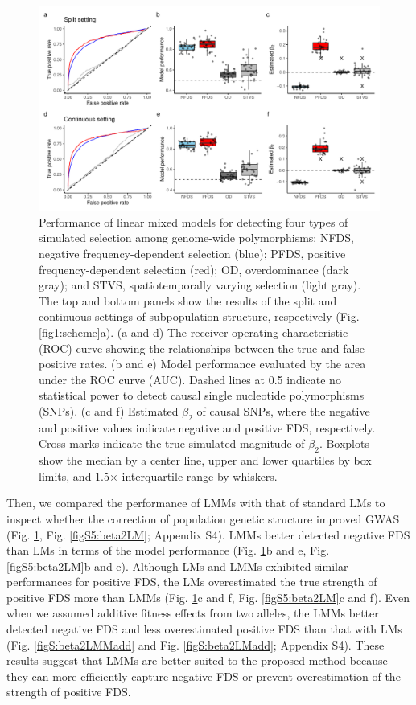 \documentclass[12pt,]{article}
\begin{document}
\begin{figure}[ht]
  \includegraphics[width=0.85\linewidth]{beta2LMMdomi.pdf}
  \caption{Performance of linear mixed models for detecting four types of simulated selection among genome-wide polymorphisms: NFDS, negative frequency-dependent selection (blue); PFDS, positive frequency-dependent selection (red); OD, overdominance (dark gray); and STVS, spatiotemporally varying selection (light gray). The top and bottom panels show the results of the split and continuous settings of subpopulation structure, respectively (Fig. \ref{fig1:scheme}a). (a and d) The receiver operating characteristic (ROC) curve showing the relationships between the true and false positive rates. (b and e) Model performance evaluated by the area under the ROC curve (AUC). Dashed lines at 0.5 indicate no statistical power to detect causal single nucleotide polymorphisms (SNPs). (c and f) Estimated $\beta_2$ of causal SNPs, where the negative and positive values indicate negative and positive FDS, respectively. Cross marks indicate the true simulated magnitude of $\beta_2$. Boxplots show the median by a center line, upper and lower quartiles by box limits, and 1.5$\times$ interquartile range by whiskers.}
  \label{fig4:beta2LMM}
\end{figure}

Then, we compared the performance of LMMs with that of standard LMs to inspect whether the correction of population genetic structure improved GWAS (Fig. \ref{fig4:beta2LMM}, Fig. \ref{figS5:beta2LM}; Appendix S4). LMMs better detected negative FDS than LMs in terms of the model performance (Fig. \ref{fig4:beta2LMM}b and e, Fig. \ref{figS5:beta2LM}b and e). Although LMs and LMMs exhibited similar performances for positive FDS, the LMs overestimated the true strength of positive FDS more than LMMs (Fig. \ref{fig4:beta2LMM}c and f, Fig. \ref{figS5:beta2LM}c and f). Even when we assumed additive fitness effects from two alleles, the LMMs better detected negative FDS and less overestimated positive FDS than that with LMs (Fig. \ref{figS:beta2LMMadd} and Fig. \ref{figS:beta2LMadd}; Appendix S4). These results suggest that LMMs are better suited to the proposed method because they can more efficiently capture negative FDS or prevent overestimation of the strength of positive FDS.
\end{document}
